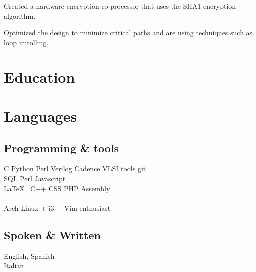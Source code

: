 \documentclass[]{deedy-resume-openfont}
\begin{document}
\begin{tightemize}
\item Created a hardware encryption co-processor that uses the SHA1 encryption algorithm.
\item Optimized the design to minimize critical paths and are using techniques such as loop unrolling.
\end{tightemize}
\sectionstep

\section{Education}
\sectionsep

\sectionsep

\section{Languages}
\begin{minipage}[t]{.6\textwidth}
\subsection{Programming \& tools}
C \textbullet{} Python \textbullet{} Perl \textbullet{} Verilog \textbullet{} Cadence VLSI tools \textbullet{} git \\
SQL \textbullet{} Perl \textbullet{} Javascript\\ \LaTeX\ \textbullet{} C++ \textbullet{} CSS \textbullet{} PHP \textbullet{} Assembly \\
\\Arch Linux + i3 + Vim enthusiast 
\sectionsep
\end{minipage}
\hfill
\begin{minipage}[t]{.35\textwidth}
\subsection{Spoken \& Written}
 English, Spanish\\
 Italian\\
\end{minipage}
\end{document}

